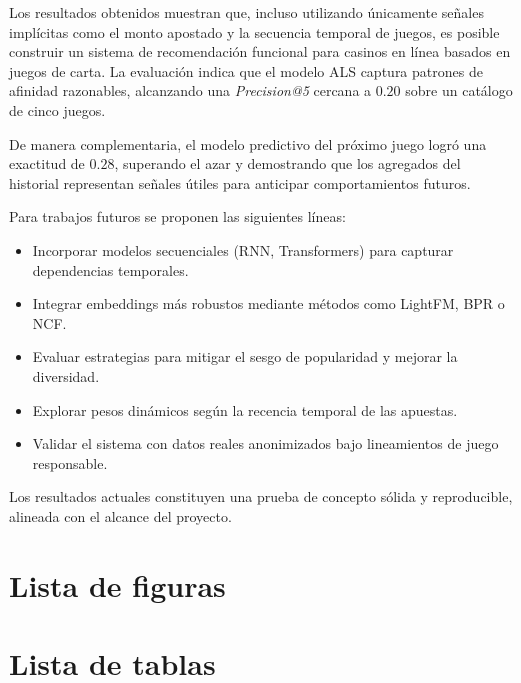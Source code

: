 \documentclass[12pt,a4paper]{article}
\begin{document}
Los resultados obtenidos muestran que, incluso utilizando únicamente señales implícitas
como el monto apostado y la secuencia temporal de juegos, es posible construir un sistema
de recomendación funcional para casinos en línea basados en juegos de carta. La
evaluación indica que el modelo ALS captura patrones de afinidad razonables, alcanzando
una \textit{Precision@5} cercana a $0.20$ sobre un catálogo de cinco juegos.

De manera complementaria, el modelo predictivo del próximo juego logró una
exactitud de $0.28$, superando el azar y demostrando que los agregados del historial
representan señales útiles para anticipar comportamientos futuros.

Para trabajos futuros se proponen las siguientes líneas:

\begin{itemize}
    \item Incorporar modelos secuenciales (RNN, Transformers) para capturar dependencias temporales.
    \item Integrar embeddings más robustos mediante métodos como LightFM, BPR o NCF.
    \item Evaluar estrategias para mitigar el sesgo de popularidad y mejorar la diversidad.
    \item Explorar pesos dinámicos según la recencia temporal de las apuestas.
    \item Validar el sistema con datos reales anonimizados bajo lineamientos de juego responsable.
\end{itemize}

Los resultados actuales constituyen una prueba de concepto sólida y reproducible,
alineada con el alcance del proyecto.



\section*{Lista de figuras}

\section*{Lista de tablas}
\end{document}
